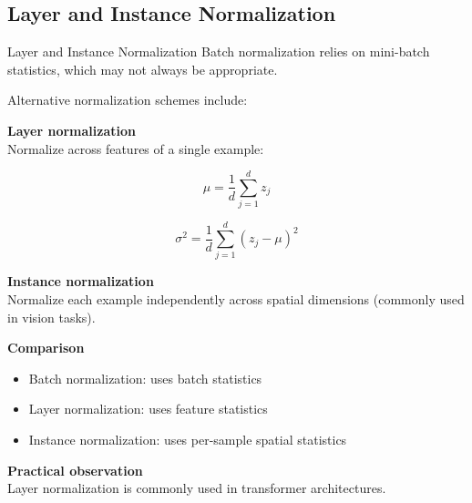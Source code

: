 \documentclass[aspectratio=169,11pt]{beamer}
\begin{document}
\subsection{Layer and Instance Normalization}
\begin{frame}[t,allowframebreaks]{Layer and Instance Normalization}
\small
Batch normalization relies on mini-batch statistics, which may not always be appropriate.

Alternative normalization schemes include:

\textbf{Layer normalization}\\ Normalize across features of a single example:

\[
\mu = \frac{1}{d}\sum_{j=1}^{d} z_j
\]

\[
\sigma^2 = \frac{1}{d}\sum_{j=1}^{d}(z_j-\mu)^2
\]

\textbf{Instance normalization}\\ Normalize each example independently across spatial dimensions (commonly used in vision tasks).

\textbf{Comparison}\\ \begin{itemize}
\item Batch normalization: uses batch statistics
\item Layer normalization: uses feature statistics
\item Instance normalization: uses per-sample spatial statistics
\end{itemize}

\textbf{Practical observation}\\ Layer normalization is commonly used in transformer architectures.
\end{frame}
\end{document}
